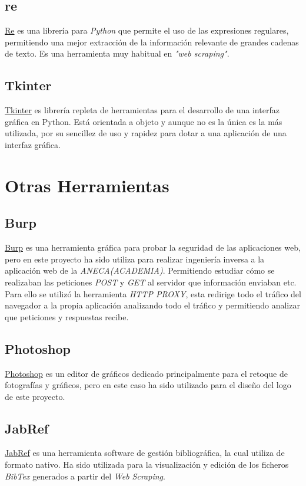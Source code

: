 \subsection{re}

\href{https://docs.python.org/3/library/re.html}{Re} es una librería para \emph{Python} que permite el uso de las expresiones regulares, permitiendo una mejor extracción de la información relevante de grandes cadenas de texto. Es una herramienta muy habitual en \emph{"web scraping"}.
\subsection{Tkinter}
\href {https://wiki.python.org/moin/TkInter}{Tkinter} es librería repleta de herramientas para el desarrollo de una interfaz gráfica en Python. Está orientada a objeto y aunque no es la única es la más utilizada, por su sencillez de uso y rapidez para dotar a una aplicación de una interfaz gráfica.

\section{Otras Herramientas}

\subsection{Burp}

\href{https://portswigger.net/burp}{Burp} es una herramienta gráfica para probar la seguridad de las aplicaciones web, pero en este proyecto ha sido utiliza para realizar ingeniería inversa a la aplicación web de la \emph{ANECA(ACADEMIA)}. Permitiendo estudiar cómo se realizaban las peticiones \emph{POST} y \emph{GET} al servidor que información enviaban etc. Para ello se utilizó la herramienta \emph{HTTP PROXY}, esta redirige todo el tráfico del navegador a la propia aplicación analizando todo el tráfico y permitiendo analizar que peticiones y respuestas recibe.

\subsection{Photoshop}
\href {https://www.photoshop.com/}{Photoshop} es un editor de gráficos dedicado principalmente para el retoque de fotografías y gráficos, pero en este caso ha sido utilizado para el diseño del logo de este proyecto.

\subsection{JabRef}

\href {http://www.jabref.org/}{JabRef} es una herramienta software de gestión bibliográfica, la cual utiliza  de formato nativo. 
Ha sido utilizada para la visualización y edición de los ficheros \emph{BibTex} generados a partir del \emph{Web Scraping}.
